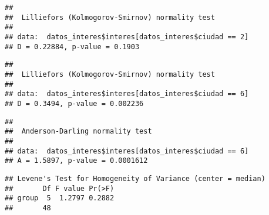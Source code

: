 \documentclass[
]{article}
\newenvironment{Shaded}{\begin{snugshade}}{\end{snugshade}}
\newcommand{\CommentTok}[1]{\textcolor[rgb]{0.56,0.35,0.01}{\textit{#1}}}
\newcommand{\DecValTok}[1]{\textcolor[rgb]{0.00,0.00,0.81}{#1}}
\newcommand{\KeywordTok}[1]{\textcolor[rgb]{0.13,0.29,0.53}{\textbf{#1}}}
\newcommand{\NormalTok}[1]{#1}
\newcommand{\OperatorTok}[1]{\textcolor[rgb]{0.81,0.36,0.00}{\textbf{#1}}}
\begin{document}
\begin{verbatim}
## 
##  Lilliefors (Kolmogorov-Smirnov) normality test
## 
## data:  datos_interes$interes[datos_interes$ciudad == 2]
## D = 0.22884, p-value = 0.1903
\end{verbatim}

\begin{Shaded}
\end{Shaded}

\begin{verbatim}
## 
##  Lilliefors (Kolmogorov-Smirnov) normality test
## 
## data:  datos_interes$interes[datos_interes$ciudad == 6]
## D = 0.3494, p-value = 0.002236
\end{verbatim}

\begin{Shaded}
\end{Shaded}

\begin{verbatim}
## 
##  Anderson-Darling normality test
## 
## data:  datos_interes$interes[datos_interes$ciudad == 6]
## A = 1.5897, p-value = 0.0001612
\end{verbatim}

\begin{Shaded}
\end{Shaded}

\begin{verbatim}
## Levene's Test for Homogeneity of Variance (center = median)
##       Df F value Pr(>F)
## group  5  1.2797 0.2882
##       48
\end{verbatim}
\end{document}
